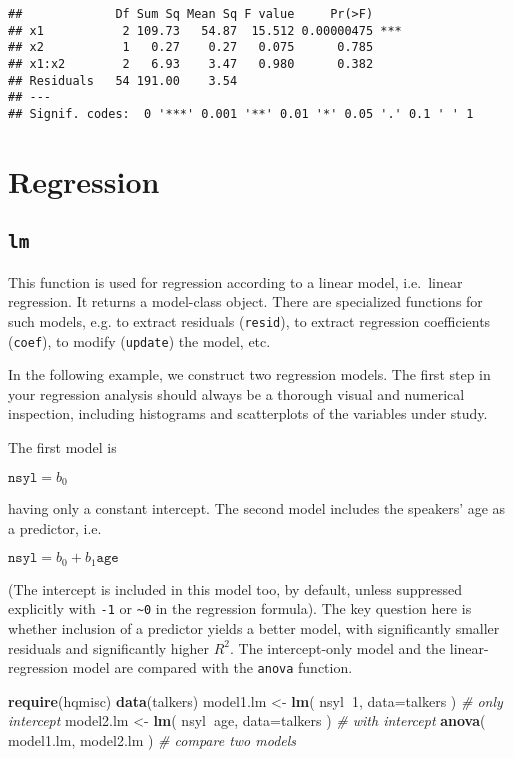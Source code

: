 \documentclass[]{book}
\newenvironment{Shaded}{\begin{snugshade}}{\end{snugshade}}
\newcommand{\CommentTok}[1]{\textcolor[rgb]{0.56,0.35,0.01}{\textit{#1}}}
\newcommand{\DataTypeTok}[1]{\textcolor[rgb]{0.13,0.29,0.53}{#1}}
\newcommand{\DecValTok}[1]{\textcolor[rgb]{0.00,0.00,0.81}{#1}}
\newcommand{\KeywordTok}[1]{\textcolor[rgb]{0.13,0.29,0.53}{\textbf{#1}}}
\newcommand{\NormalTok}[1]{#1}
\newcommand{\OperatorTok}[1]{\textcolor[rgb]{0.81,0.36,0.00}{\textbf{#1}}}
\newcommand{\StringTok}[1]{\textcolor[rgb]{0.31,0.60,0.02}{#1}}
\begin{document}
\begin{verbatim}
##             Df Sum Sq Mean Sq F value     Pr(>F)    
## x1           2 109.73   54.87  15.512 0.00000475 ***
## x2           1   0.27    0.27   0.075      0.785    
## x1:x2        2   6.93    3.47   0.980      0.382    
## Residuals   54 191.00    3.54                       
## ---
## Signif. codes:  0 '***' 0.001 '**' 0.01 '*' 0.05 '.' 0.1 ' ' 1
\end{verbatim}

\hypertarget{ch:regression}{%
\chapter{Regression}\label{ch:regression}}

\hypertarget{lm}{%
\section{\texorpdfstring{\texttt{lm}}{lm}}\label{lm}}

This function is used for regression according to a linear model,
i.e.~linear regression. It returns a model-class object. There are
specialized functions for such models, e.g.
to extract residuals (\texttt{resid}),
to extract regression coefficients (\texttt{coef}),
to modify (\texttt{update}) the model, etc.

In the following example, we construct two regression models.
The first step in your regression analysis should always be a thorough visual and numerical inspection, including histograms and scatterplots of the variables under
study.

The first model is

\(\texttt{nsyl} = b_0\)

having only a
constant intercept. The second model includes the speakers' age as a
predictor, i.e.

\(\texttt{nsyl} = b_0 + b_1 \texttt{age}\)

(The intercept is included in this model too, by default, unless
suppressed explicitly with \texttt{-1} or
\texttt{\textasciitilde{}0} in the regression formula). The key
question here is whether inclusion of a predictor yields a better
model, with significantly smaller residuals and significantly higher
\(R^2\). The intercept-only model and the linear-regression model are
compared with the \texttt{anova} function.

\begin{Shaded}
\begin{Highlighting}[]
\KeywordTok{require}\NormalTok{(hqmisc)}
\KeywordTok{data}\NormalTok{(talkers)}
\NormalTok{model1.lm <-}\StringTok{ }\KeywordTok{lm}\NormalTok{( nsyl}\OperatorTok{~}\DecValTok{1}\NormalTok{, }\DataTypeTok{data=}\NormalTok{talkers ) }\CommentTok{# only intercept}
\NormalTok{model2.lm <-}\StringTok{ }\KeywordTok{lm}\NormalTok{( nsyl}\OperatorTok{~}\NormalTok{age, }\DataTypeTok{data=}\NormalTok{talkers ) }\CommentTok{# with intercept}
\KeywordTok{anova}\NormalTok{( model1.lm, model2.lm ) }\CommentTok{# compare two models}
\end{Highlighting}
\end{Shaded}
\end{document}
